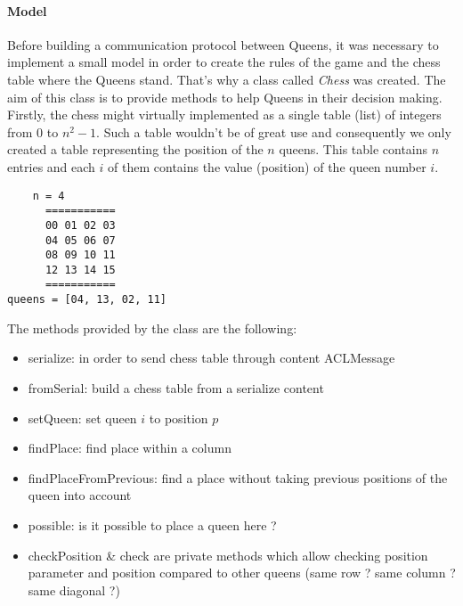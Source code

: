 \documentclass[a4paper,11pt]{article}
\begin{document}
  \paragraph{Model}
  Before building a communication protocol between Queens, it was necessary to implement a 
  small model in order to create the rules of the game and the chess table where the Queens stand. That's 
  why a class called \textit{Chess} was created. The aim of this class is to provide 
  methods to help Queens in their decision making. Firstly, the chess might virtually implemented as a 
  single table (list) of integers from 0 to $n^2-1$. Such a table wouldn't be of great use and consequently
  we only created a table representing the position of the $n$ queens. This table contains $n$ entries 
  and each $i$ of them contains the value (position) of the queen number $i$.
  \begin{verbatim}
	n = 4
      ===========
      00 01 02 03
      04 05 06 07
      08 09 10 11
      12 13 14 15
      ===========
queens = [04, 13, 02, 11]
  \end{verbatim}

  The methods provided by the class are the following:
  \begin{itemize}
   \item serialize: in order to send chess table through content ACLMessage
   \item fromSerial: build a chess table from a serialize content
   \item setQueen: set queen $i$ to position $p$
   \item findPlace: find place within a column
   \item findPlaceFromPrevious: find a place without taking previous positions of the queen into account
   \item possible: is it possible to place a queen here ?
   \item checkPosition \& check are private methods which allow checking position parameter and position 
   compared to other queens (same row ? same column ? same diagonal ?)
  \end{itemize}
\end{document}
